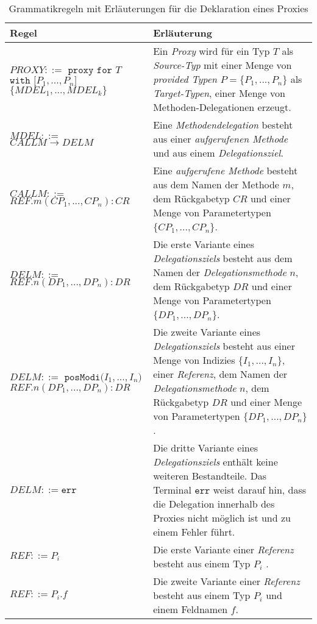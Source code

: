 \begin{table}[H]
\centering
\begin{tabular}{|p{5cm}|p{9cm}|}
\hline
\hline
\centering\textbf{Regel} & \textbf{Erläuterung} \\
\hline
\hline
$\mathit{PROXY} ::=$\newline
$\texttt{proxy } \texttt{for } T$\newline
$ \texttt{with [}\mathit{P_1},...,\mathit{P_n}\texttt{]}$ \newline
$\texttt{\{}\mathit{MDEL_1},...,\mathit{MDEL_k} \texttt{\}}$
 & Ein \emph{Proxy} wird für ein Typ $T$ als \emph{Source-Typ} mit einer Menge von \emph{provided Typen} $P = \{P_1,...,P_n\}$ als \emph{Target-Typen}, einer Menge von Methoden-Delegationen erzeugt.\\
\hline
$\mathit{MDEL} ::=$\newline
$CALLM \rightarrow DELM $  & Eine \emph{Methodendelegation} besteht aus einer \emph{aufgerufenen Methode} und aus einem \emph{Delegationsziel}.\\
\hline
$\mathit{CALLM} ::=$\newline 
$\mathit{REF}.\mathit{m(\mathit{CP_1},...,\mathit{CP_n}):CR} $  & Eine \emph{aufgerufene Methode} besteht aus dem Namen der Methode $m$, dem Rückgabetyp $\mathit{CR}$ und einer Menge von Parametertypen $\{\mathit{CP_1},...,\mathit{CP_n}\}$.\\
\hline
$\mathit{DELM} ::=$\newline 
$\mathit{REF}.\mathit{n(\mathit{DP_1},...,\mathit{DP_n}):DR} $  
& Die erste Variante eines \emph{Delegationsziels} besteht aus  dem Namen der \emph{Delegationsmethode} $n$, dem Rückgabetyp $\mathit{DR}$ und einer Menge von Parametertypen $\{\mathit{DP_1},...,\mathit{DP_n}\}$.\\
\hline
$\mathit{DELM} ::=$\newline
$\texttt{posModi(} \mathit{I_1},...,\mathit{I_n} \texttt{)}$\newline
$\mathit{REF}.\mathit{n(\mathit{DP_1},...,\mathit{DP_n}):DR} $  
& Die zweite Variante eines \emph{Delegationsziels} besteht aus einer Menge von Indizies $\{\mathit{I_1},...,\mathit{I_n}\}$, einer \emph{Referenz}, dem Namen der \emph{Delegationsmethode} $n$, dem Rückgabetyp $\mathit{DR}$ und einer Menge von Parametertypen $\{\mathit{DP_1},...,\mathit{DP_n}\}$.\\
\hline
$\mathit{DELM} ::= \texttt{err} $  
& Die dritte Variante eines \emph{Delegationsziels} enthält keine weiteren Bestandteile. Das Terminal $\texttt{err}$ weist darauf hin, dass die Delegation innerhalb des Proxies nicht möglich ist und zu einem Fehler führt.\\
\hline
$\mathit{REF} ::= \mathit{P_i}$
& Die erste Variante einer \emph{Referenz} besteht aus einem Typ $P_i$ .\\
\hline
$\mathit{REF} ::= \mathit{P_i}\texttt{.}\mathit{f}$
& Die zweite Variante einer \emph{Referenz} besteht aus einem Typ $P_i$ und einem Feldnamen $f$.\\
\hline
\end{tabular}
\caption{Grammatikregeln mit Erläuterungen für die Deklaration eines Proxies}
 \label{tab:grProxies}
\end{table}
